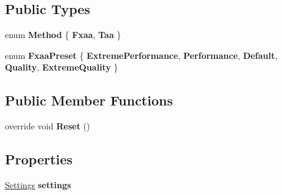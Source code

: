 \subsection*{Public Types}
\begin{DoxyCompactItemize}
\item 
\mbox{\label{class_unity_engine_1_1_post_processing_1_1_antialiasing_model_ab5cf39cfa77f367f530971a77518e89f}} 
enum {\bfseries Method} \{ {\bfseries Fxaa}, 
{\bfseries Taa}
 \}
\item 
\mbox{\label{class_unity_engine_1_1_post_processing_1_1_antialiasing_model_a8fa1e784663b26f942fb5558e3328bc4}} 
enum {\bfseries Fxaa\+Preset} \{ \newline
{\bfseries Extreme\+Performance}, 
{\bfseries Performance}, 
{\bfseries Default}, 
{\bfseries Quality}, 
\newline
{\bfseries Extreme\+Quality}
 \}
\end{DoxyCompactItemize}
\subsection*{Public Member Functions}
\begin{DoxyCompactItemize}
\item 
\mbox{\label{class_unity_engine_1_1_post_processing_1_1_antialiasing_model_aeed2830b0c1b3a6ef09c0aea26b0b206}} 
override void {\bfseries Reset} ()
\end{DoxyCompactItemize}
\subsection*{Properties}
\begin{DoxyCompactItemize}
\item 
\mbox{\label{class_unity_engine_1_1_post_processing_1_1_antialiasing_model_af1ad76b667f86a55a3db817f6ebfdbe9}} 
\hyperlink{struct_unity_engine_1_1_post_processing_1_1_antialiasing_model_1_1_settings}{Settings} {\bfseries settings}
\end{DoxyCompactItemize}
